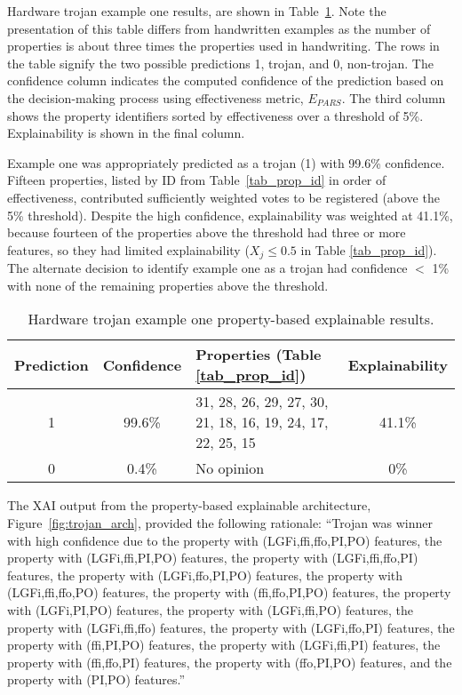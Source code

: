 Hardware trojan example one results, are shown in Table~\ref{tab_prop_exp_ex_1}.
Note the presentation of this table differs from handwritten examples as the
number of properties is about three times the properties used in handwriting.
The rows in the table signify the two possible predictions 1, trojan, and 0,
non-trojan. The confidence column indicates the computed confidence of the
prediction based on the decision-making process using effectiveness metric,
$E_{PARS}$.  The third column shows the property identifiers sorted by
effectiveness over a threshold of 5\%. Explainability is shown in the final
column.

Example one  was appropriately predicted as a trojan (1) with 99.6\% confidence.
Fifteen properties, listed by ID from Table~\ref{tab_prop_id} in order of
effectiveness, contributed sufficiently weighted votes to be registered (above
the 5\% threshold).  Despite the high confidence, explainability was weighted at
41.1\%, because fourteen of the properties above the threshold had three or more
features, so they had limited explainability ($X_j\leq0.5$ in Table
\ref{tab_prop_id}). The alternate decision to identify example one as a trojan
had confidence $<$ 1\% with none of the remaining properties above the
threshold.

\begin{table}[H]
    \renewcommand{\arraystretch}{1.3}
    \caption{Hardware trojan example one property-based explainable results.}
    \begin{center}
    \begin{tabular}{|c|c|p{}|c|}
        \hline
         Prediction &  Confidence &  Properties (Table \ref{tab_prop_id}) &  Explainability \\
        \hline
        \hline
        1 & 99.6\% & 31, 28, 26, 29, 27, 30, 21, 18, 16, 19, 24, 17, 22, 25, 15 & 41.1\% \\
        \hline
        0 & 0.4\% & No opinion & 0\% \\
        \hline
    \end{tabular}
    \end{center}
    \label{tab_prop_exp_ex_1}
\end{table}

The XAI output from the property-based explainable architecture,
Figure~\ref{fig:trojan_arch}, provided the following rationale: ``Trojan was
winner with high confidence due to the property with (LGFi,ffi,ffo,PI,PO)
features, the property with (LGFi,ffi,PI,PO) features, the property with
(LGFi,ffi,ffo,PI) features, the property with (LGFi,ffo,PI,PO) features, the
property with (LGFi,ffi,ffo,PO) features, the property with (ffi,ffo,PI,PO)
features, the property with (LGFi,PI,PO) features, the property with
(LGFi,ffi,PO) features, the property with (LGFi,ffi,ffo) features, the property
with (LGFi,ffo,PI) features, the property with (ffi,PI,PO) features, the
property with (LGFi,ffi,PI) features, the property with (ffi,ffo,PI) features,
the property with (ffo,PI,PO) features, and the property with (PI,PO)
features.''

